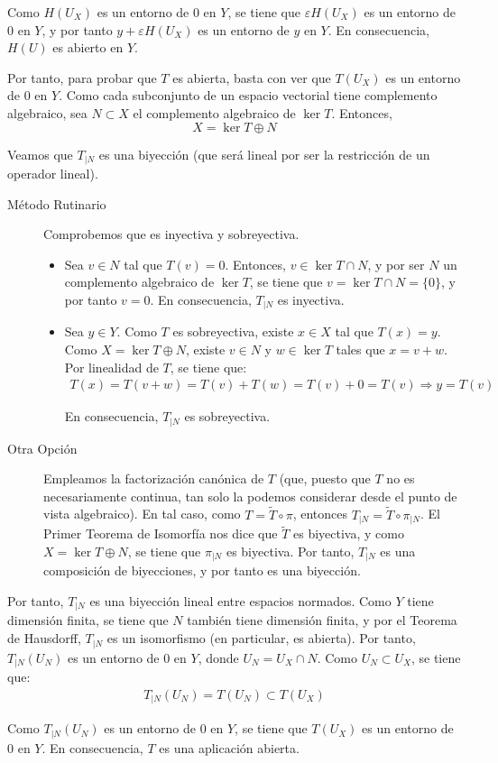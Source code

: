 \begin{ejercicio}
\begin{description}
    Como $H(U_X)$ es un entorno de $0$ en $Y$, se tiene que $\varepsilon H(U_X)$ es un entorno de $0$ en $Y$, y por tanto $y+\varepsilon H(U_X)$ es un entorno de $y$ en $Y$. En consecuencia, $H(U)$ es abierto en $Y$.
\end{description}

Por tanto, para probar que $T$ es abierta, basta con ver que $T(U_X)$ es un entorno de $0$ en $Y$. Como cada subconjunto de un espacio vectorial tiene complemento algebraico, sea $N\subset X$ el complemento algebraico de $\ker T$. Entonces,
$$X = \ker T \oplus N$$

Veamos que $T_{|N}$ es una biyección (que será lineal por ser la restricción de un operador lineal).
\begin{description}
    \item[Método Rutinario] Comprobemos que es inyectiva y sobreyectiva.
    \begin{itemize}
        \item Sea $v\in N$ tal que $T(v) = 0$. Entonces, $v \in \ker T \cap N$, y por ser $N$ un complemento algebraico de $\ker T$, se tiene que $v = \ker T \cap N = \{0\}$, y por tanto $v=0$. En consecuencia, $T_{|N}$ es inyectiva.
        \item Sea $y \in Y$. Como $T$ es sobreyectiva, existe $x \in X$ tal que $T(x) = y$. Como $X = \ker T \oplus N$, existe $v \in N$ y $w \in \ker T$ tales que $x = v + w$. Por linealidad de $T$, se tiene que:
        \begin{align*}
            T(x) = T(v + w) = T(v) + T(w) = T(v) + 0 = T(v) \Longrightarrow y = T(v)
        \end{align*}

        En consecuencia, $T_{|N}$ es sobreyectiva.
    \end{itemize}

    \item[Otra Opción] Empleamos la factorización canónica de $T$ (que, puesto que $T$ no es necesariamente continua, tan solo la podemos considerar desde el punto de vista algebraico). En tal caso, como $T=\tilde{T} \circ \pi$, entonces $T_{|N} = \tilde{T} \circ \pi_{|N}$. El Primer Teorema de Isomorfía nos dice que $\tilde{T}$ es biyectiva, y como $X=\ker T \oplus N$, se tiene que $\pi_{|N}$ es biyectiva. Por tanto, $T_{|N}$ es una composición de biyecciones, y por tanto es una biyección.
\end{description}

Por tanto, $T_{|N}$ es una biyección lineal entre espacios normados. Como $Y$ tiene dimensión finita, se tiene que $N$ también tiene dimensión finita, y por el Teorema de Hausdorff, $T_{|N}$ es un isomorfismo (en particular, es abierta). Por tanto, $T_{|N}(U_N)$ es un entorno de $0$ en $Y$, donde $U_N = U_X \cap N$. Como $U_N \subset U_X$, se tiene que:
\begin{align*}
    T_{|N}(U_N) = T(U_N) \subset T(U_X)
\end{align*}

Como $T_{|N}(U_N)$ es un entorno de $0$ en $Y$, se tiene que $T(U_X)$ es un entorno de $0$ en $Y$. En consecuencia, $T$ es una aplicación abierta.
\end{ejercicio}

